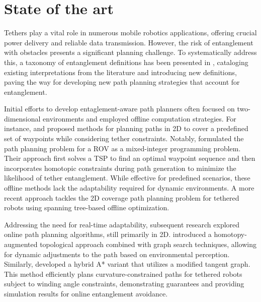\section{State of the art}
\label{sec:related_work}

Tethers play a vital role in numerous mobile robotics applications, offering crucial power delivery and reliable data transmission. However, the risk of entanglement with obstacles presents a significant planning challenge. To systematically address this, a taxonomy of entanglement definitions has been presented in \cite{definitions}, cataloging existing interpretations from the literature and introducing new definitions, paving the way for developing new path planning strategies that account for entanglement.

Initial efforts to develop entaglement-aware path planners often focused on two-dimensional environments and employed offline computation strategies. For instance, \cite{rov_mccammon} and \cite{mechsy2017novel} proposed methods for planning paths in 2D to cover a predefined set of waypoints while considering tether constraints. Notably, \cite{mechsy2017novel} formulated the path planning problem for a \ac{ROV} as a mixed-integer programming problem. Their approach first solves a \ac{TSP} to find an optimal waypoint sequence and then incorporates homotopic constraints during path generation to minimize the likelihood of tether entanglement. While effective for predefined scenarios, these offline methods lack the adaptability required for dynamic environments. A more recent approach \cite{peng2025spanning} tackles the 2D coverage path planning problem for tethered robots using spanning tree-based offline optimization.

Addressing the need for real-time adaptability, subsequent research explored online path planning algorithms, still primarily in 2D. \cite{kim} introduced a homotopy-augmented topological approach combined with graph search techniques, allowing for dynamic adjustments to the path based on environmental perception. Similarly, \cite{withy} developed a hybrid A* variant that utilizes a modified tangent graph. This method efficiently plans curvature-constrained paths for tethered robots subject to winding angle constraints, demonstrating guarantees and providing simulation results for online entanglement avoidance. 

